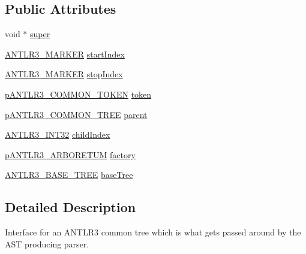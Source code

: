 \subsection*{Public Attributes}
\begin{DoxyCompactItemize}
\item 
void $\ast$ \hyperlink{struct_a_n_t_l_r3___c_o_m_m_o_n___t_r_e_e__struct_a7050b0be53cfd6f2aa4923becd806db5}{super}
\item 
\hyperlink{antlr3defs_8h_a0361e6bf442e07afe923e4d05e9ebc4f}{A\-N\-T\-L\-R3\-\_\-\-M\-A\-R\-K\-E\-R} \hyperlink{struct_a_n_t_l_r3___c_o_m_m_o_n___t_r_e_e__struct_a2c813f62d05d88ef73b83201fd9decf6}{start\-Index}
\item 
\hyperlink{antlr3defs_8h_a0361e6bf442e07afe923e4d05e9ebc4f}{A\-N\-T\-L\-R3\-\_\-\-M\-A\-R\-K\-E\-R} \hyperlink{struct_a_n_t_l_r3___c_o_m_m_o_n___t_r_e_e__struct_a4747603f0393de0e6faf824e5419b789}{stop\-Index}
\item 
\hyperlink{antlr3interfaces_8h_adaa6df9cbf0cd7ab37fd545520ff299b}{p\-A\-N\-T\-L\-R3\-\_\-\-C\-O\-M\-M\-O\-N\-\_\-\-T\-O\-K\-E\-N} \hyperlink{struct_a_n_t_l_r3___c_o_m_m_o_n___t_r_e_e__struct_a0328c4ee838188d11da140a0fd47edfe}{token}
\item 
\hyperlink{antlr3interfaces_8h_a5671d97032ad9e56b12b661b38b07afd}{p\-A\-N\-T\-L\-R3\-\_\-\-C\-O\-M\-M\-O\-N\-\_\-\-T\-R\-E\-E} \hyperlink{struct_a_n_t_l_r3___c_o_m_m_o_n___t_r_e_e__struct_a0c48243a71441dd67cb307dc35dc49ab}{parent}
\item 
\hyperlink{antlr3defs_8h_a6faef5c4687f8eb633d2aefea93973ca}{A\-N\-T\-L\-R3\-\_\-\-I\-N\-T32} \hyperlink{struct_a_n_t_l_r3___c_o_m_m_o_n___t_r_e_e__struct_afe231f9f4e1979f1765abdc677198ebf}{child\-Index}
\item 
\hyperlink{antlr3interfaces_8h_a400ca2545f5a9f036bfb533b9d345128}{p\-A\-N\-T\-L\-R3\-\_\-\-A\-R\-B\-O\-R\-E\-T\-U\-M} \hyperlink{struct_a_n_t_l_r3___c_o_m_m_o_n___t_r_e_e__struct_ab2cba63bc8ae9fcd0916fa9c0903982a}{factory}
\item 
\hyperlink{antlr3basetree_8h_a7b4311ecc7fa341cd6211cac3236738f}{A\-N\-T\-L\-R3\-\_\-\-B\-A\-S\-E\-\_\-\-T\-R\-E\-E} \hyperlink{struct_a_n_t_l_r3___c_o_m_m_o_n___t_r_e_e__struct_aab30e9fd47c078a3343498ca41bb2b0d}{base\-Tree}
\end{DoxyCompactItemize}


\subsection{Detailed Description}
Interface for an A\-N\-T\-L\-R3 common tree which is what gets passed around by the A\-S\-T producing parser. 

